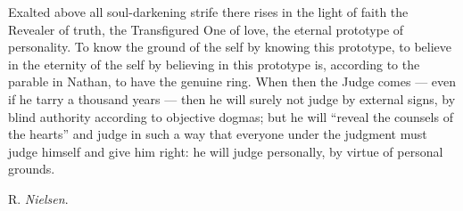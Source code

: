 \documentclass[12pt,a4paper,openany]{book}
\newcommand{\opage}[1]{\marginnote{\footnotesize\textit{[#1]}}}
\newcommand{\signature}[1]{\par\smallskip\hfill #1\hspace*{2em}\par}
\begin{document}
Exalted above all soul-darkening strife there rises
in the light of faith the Revealer of truth, the Transfigured One of love,
the eternal prototype of personality. To know
\setcounter{footnote}{0}%
\opage{622}the ground of the self by knowing this prototype, to believe
in the eternity of the self by believing in this prototype is,
according to the parable in Nathan, to have the genuine ring. When
then the Judge comes --- even if he tarry a thousand
years --- then he will surely not judge by external signs,
by blind authority according to objective dogmas; but he
will ``reveal the counsels of the hearts'' and judge in such a way that
everyone under the judgment must judge himself and give
him right: he will judge personally, by virtue of personal
grounds.

\signature{R. \emph{Nielsen}.}
\end{document}
